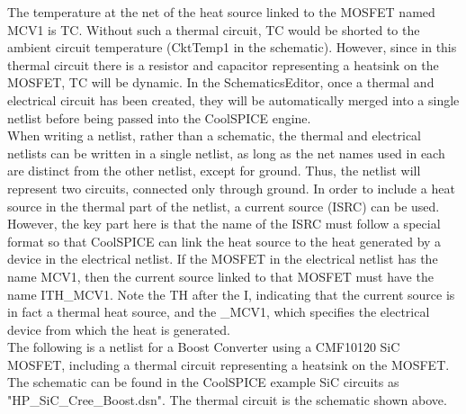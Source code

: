 The temperature at the net of the heat source linked to the MOSFET named MCV1 is TC. Without such a thermal circuit, TC would be shorted to the ambient circuit temperature (CktTemp1 in the schematic). However, since in this thermal circuit there is a resistor and capacitor representing a heatsink on the MOSFET, TC will be dynamic. In the SchematicsEditor, once a thermal and electrical circuit has been created, they will be automatically merged into a single netlist before being passed into the CoolSPICE engine. \\

When writing a netlist, rather than a schematic, the thermal and electrical netlists can be written in a single netlist, as long as the net names used in each are distinct from the other netlist, except for ground. Thus, the netlist will represent two circuits, connected only through ground. In order to include a heat source in the thermal part of the netlist, a current source (ISRC) can be used. However, the key part here is that the name of the ISRC must follow a special format so that CoolSPICE can link the heat source to the heat generated by a device in the electrical netlist. If the MOSFET in the electrical netlist has the name {\selectfont MCV1}, then the current source linked to that MOSFET must have the name {\selectfont ITH\_MCV1}. Note the {\selectfont TH} after the {\selectfont I}, indicating that the current source is in fact a thermal heat source, and the {\selectfont \_MCV1}, which specifies the electrical device from which the heat is generated. \\

The following is a netlist for a Boost Converter using a CMF10120 SiC MOSFET, including a thermal circuit representing a heatsink on the MOSFET. The schematic can be found in the CoolSPICE example SiC circuits as "HP\_SiC\_Cree\_Boost.dsn". The thermal circuit is the schematic shown above. \\

